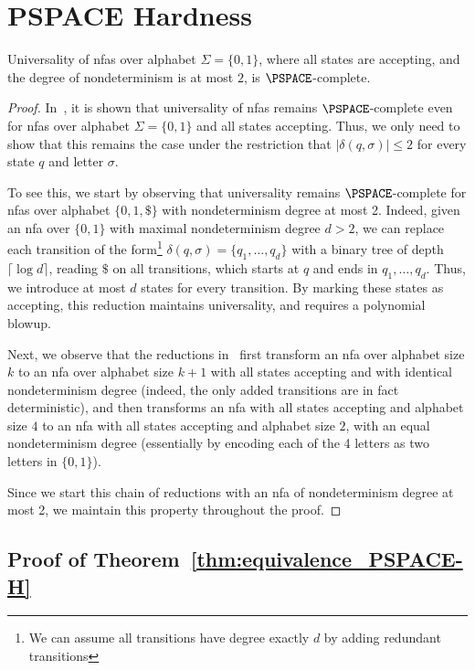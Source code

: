 \chapter{PSPACE Hardness}
\label{chap:apx}

\begin{lemma}
\label{lem:universalityofnfa}
Universality of \glspl{nfa} over alphabet $\Sigma=\{0,1\}$, where all states are accepting, and the degree of nondeterminism is at most $2$, is $\PSPACE$-complete.
\end{lemma}
\begin{proof}
In~\cite{kao2009nfas}, it is shown that universality of \glspl{nfa} remains $\PSPACE$-complete even for \glspl{nfa} over alphabet $\Sigma=\{0,1\}$ and all states accepting. Thus, we only need to show that this remains the case under the restriction that $|\delta(q,\sigma)|\le 2$ for every state $q$ and letter $\sigma$.

To see this, we start by observing that universality remains $\PSPACE$-complete for \glspl{nfa} over alphabet $\{0,1,\$\}$ with nondeterminism degree at most 2. Indeed, given an \gls{nfa} over $\{0,1\}$ with maximal nondeterminism degree $d>2$, we can replace each transition of the form\footnote{We can assume all transitions have degree exactly $d$ by adding redundant transitions} $\delta(q,\sigma)=\{q_1,\ldots, q_d\}$ with a binary tree of depth $\lceil \log d \rceil$, reading $\$$ on all transitions, which starts at $q$ and ends in $q_1,\ldots,q_d$. Thus, we introduce at most $d$ states for every transition. By marking these states as accepting, this reduction maintains universality, and requires a polynomial blowup.

Next, we observe that the reductions in~\cite[Lemma 2]{kao2009nfas} first transform an \gls{nfa} over alphabet size $k$ to an \gls{nfa} over alphabet size $k+1$ with all states accepting and with identical nondeterminism degree (indeed, the only added transitions are in fact deterministic), and then transforms an \gls{nfa} with all states accepting and alphabet size $4$ to an \gls{nfa} with all states accepting and alphabet size $2$, with an equal nondeterminism degree (essentially by encoding each of the 4 letters as two letters in $\{0,1\}$).

Since we start this chain of reductions with an \gls{nfa} of nondeterminism degree at most 2, we maintain this property throughout the proof.
\end{proof}

\section{Proof of Theorem~\ref{thm:equivalence_PSPACE-H}}
\label{apx:proof_equivalence_PSPACE-H}

